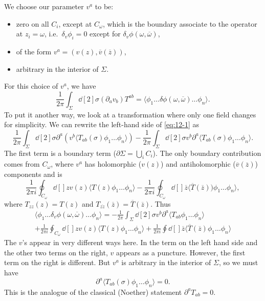 We choose our parameter $v^{a}$  to be:
\begin{itemize}
  \item zero on all $C_i$, except at $C_{\omega}$, which is the boundary associate to the operator at $z_i = \omega$, i.e.~$\delta_v \phi_i = 0$ except for $\delta_v \phi(\omega, \overline{\omega}{})$,
  \item of the form $v^{a} = (v(z), \overline{v}{}(\overline{z}{}))$,
  \item arbitrary in the interior of $\Sigma$.
\end{itemize}
For this choice of $v^{a}$, we have
\begin{equation}
  \label{eq:12-1}
  \frac{1}{2\pi} \int_{\Sigma} \dd[2]{\sigma} (\partial_{a} v_{b}) T^{ab} = \langle \phi_1 \dots \delta \phi(\omega, \overline{\omega}{}) \dots \phi_n \rangle.
\end{equation}
To put it another way, we look at a transformation where only one field changes for simplicity.
We can rewrite the left-hand side of \eqref{eq:12-1} as
\begin{equation}
  \frac{1}{2\pi} \int_{\Sigma} \dd[2]{\sigma} \partial^{a} (v^{b} \langle T_{ab}(\sigma) \phi_1 \dots \phi_n \rangle) -\frac{1}{2\pi} \int_{\Sigma} \dd[2]{\sigma} v^{b} \partial^{a} \langle T_{ab}(\sigma) \phi_1 \dots \phi_n \rangle.
\end{equation}
The first term is a boundary term ($\partial \Sigma = \bigcup_i C_i$).
The only boundary contribution comes from $C_{\omega}$, where $v^{a}$ has holomorphic ($v(z)$) and antiholomorphic ($\overline{v}{}(\overline{z}{})$) components and is
\begin{equation}
  \frac{1}{2\pi i} \oint_{C_\omega} \dd[]{z} v(z) \langle T(z) \phi_1 \dots \phi_n \rangle - \frac{1}{2\pi i} \oint_{C_\omega} \dd[]{\overline{z}{}} \langle \overline{T}{}(\overline{z}{})) \phi_1 \dots \phi_n \rangle,
\end{equation}
where $T_{zz}(z) = T(z)$  and $T_{\overline{zz}{}} (\overline{z}{}) = \overline{T}{}(\overline{z}{})$.
Thus
\begin{multline}
  \langle \phi_1 \dots \delta_v \phi(\omega, \overline{\omega}{}) \dots \phi_n \rangle = - \frac{1}{2\pi} \int_{\Sigma} \dd[2]{\sigma} v^{b}  \partial^{a} \langle T_{ab} \phi_1 \dots \phi_n \rangle  \\
  + \frac{1}{2\pi i} \oint_{C_{\omega}} \dd[]{z} v(z) \langle T(z) \phi_1 \dots \phi_n \rangle
  + \frac{1}{2\pi i} \oint \dd[]{\overline{z}{}} \langle \overline{T}{}(\overline{z}{}) \phi_1 \dots \phi_n \rangle
\end{multline}
The $v$'s appear in very different ways here.
In the term on the left hand side and the other two terms on the right, $v$ appears as a puncture.
However, the first term on the right is different.
But $v^{a}$ is arbitrary in the interior of $\Sigma$, so we must have
\begin{equation}
  \partial^{a} \langle T_{ab} (\sigma) \phi_1 \dots \phi_n \rangle = 0.
\end{equation}
This is the analogue of the classical (Noether) statement $\partial^{a} T_{ab} = 0$.

